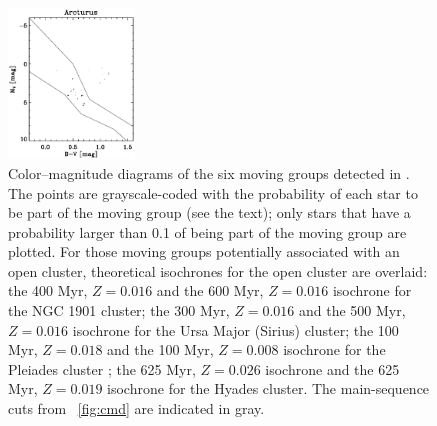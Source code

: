 \begin{figure}
\includegraphics[width=0.3\textwidth]{figs_groups/cmd_arcturus.ps}
\caption[Color--magnitude diagrams of the six moving groups detected
in \bhr]{Color--magnitude diagrams of the six moving groups detected
in \bhr. The points are grayscale-coded with the probability of each
star to be part of the moving group (see the text); only stars that
have a probability larger than 0.1 of being part of the moving group
are plotted. For those moving groups potentially associated with an
open cluster, theoretical isochrones \citep{Marigo08a,Bertelli94a} for
the open cluster are overlaid: the 400 Myr, $Z=0.016$
\citep{Carraro07a} and the 600 Myr, $Z=0.016$ \citep{Pavani01a}
isochrone for the NGC 1901 cluster; the 300 Myr, $Z=0.016$
\citep{1993AJ....105..226S} and the 500 Myr, $Z=0.016$ \citep{King03a}
isochrone for the Ursa Major (Sirius) cluster; the 100 Myr, $Z= 0.018$
\citep{Boesgaard90a,Gratton00a} and the 100 Myr, $Z=0.008$
\citep{Percival05a} isochrone for the Pleiades cluster ; the 625 Myr,
$Z = 0.026$ isochrone \citep{Perryman98a} and the 625 Myr, $Z=0.019$
isochrone for the Hyades cluster. The main-sequence cuts from
\figurename~\ref{fig:cmd} are indicated in gray.}\label{fig:groupcmd}
\end{figure}

